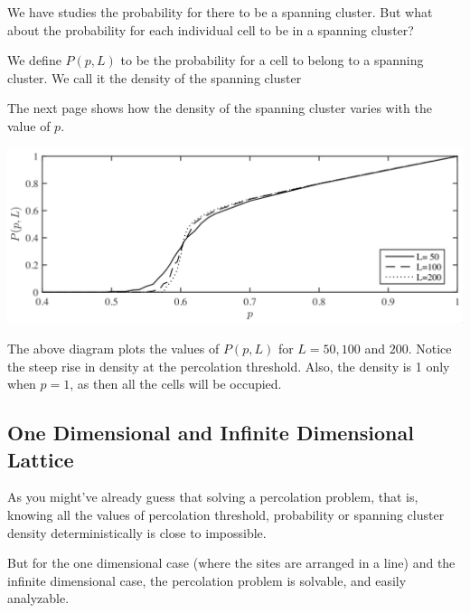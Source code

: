 \documentclass[compress]{beamer}
\newcommand{\imp}[1]{\textcolor{NordRed}{#1}}
\begin{document}
\begin{frame}
    We have studies the probability for there to be a spanning cluster. But what about the
    probability for each individual cell to be in a spanning cluster?

    \vspace{1em}

    We define \imp{\(P(p, L)\)} to be the probability for a cell to belong to a spanning
    cluster. We call it the \imp{density of the spanning cluster}

    \vspace{1em}

    The next page shows how the density of the spanning cluster varies with the value of
    \(p\).
\end{frame}

\begin{frame}
    \begin{center}
        \includegraphics[width=\linewidth]{ppLvsp.png}
    \end{center}

    The above diagram plots the values of \(P(p, L)\) for \(L = 50, 100\) and \(200\).
    Notice the steep rise in density at the percolation threshold. Also, the density is 1
    only when \(p=1\), as then all the cells will be occupied.
\end{frame}


\subsection{One Dimensional and Infinite Dimensional Lattice}

\begin{frame}
    As you might've already guess that solving a percolation problem, that is, knowing all
    the values of percolation threshold, probability or spanning cluster density
    deterministically is close to impossible.

    \vspace{1em}

    But for the one dimensional case (where the sites are arranged in a line) and the
    infinite dimensional case, the percolation problem is solvable, and easily analyzable.
\end{frame}
\end{document}
